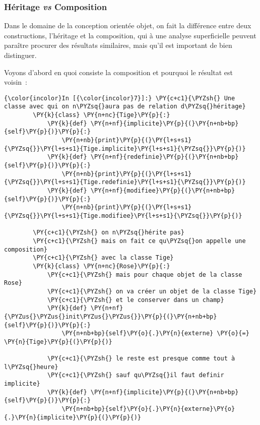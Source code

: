     \hypertarget{huxe9ritage-vs-composition}{%
\subsubsection{\texorpdfstring{Héritage \emph{vs}
Composition}{Héritage vs Composition}}\label{huxe9ritage-vs-composition}}

    Dans le domaine de la conception orientée objet, on fait la différence
entre deux constructions, l'héritage et la composition, qui à une
analyse superficielle peuvent paraître procurer des résultats
similaires, mais qu'il est important de bien distinguer.

Voyons d'abord en quoi consiste la composition et pourquoi le résultat
est voisin~:

    \begin{Verbatim}[commandchars=\\\{\}]
{\color{incolor}In [{\color{incolor}7}]:} \PY{c+c1}{\PYZsh{} Une classe avec qui on n\PYZsq{}aura pas de relation d\PYZsq{}héritage}
        \PY{k}{class} \PY{n+nc}{Tige}\PY{p}{:}
            \PY{k}{def} \PY{n+nf}{implicite}\PY{p}{(}\PY{n+nb+bp}{self}\PY{p}{)}\PY{p}{:}
                \PY{n+nb}{print}\PY{p}{(}\PY{l+s+s1}{\PYZsq{}}\PY{l+s+s1}{Tige.implicite}\PY{l+s+s1}{\PYZsq{}}\PY{p}{)}
            \PY{k}{def} \PY{n+nf}{redefinie}\PY{p}{(}\PY{n+nb+bp}{self}\PY{p}{)}\PY{p}{:}
                \PY{n+nb}{print}\PY{p}{(}\PY{l+s+s1}{\PYZsq{}}\PY{l+s+s1}{Tige.redefinie}\PY{l+s+s1}{\PYZsq{}}\PY{p}{)}
            \PY{k}{def} \PY{n+nf}{modifiee}\PY{p}{(}\PY{n+nb+bp}{self}\PY{p}{)}\PY{p}{:}
                \PY{n+nb}{print}\PY{p}{(}\PY{l+s+s1}{\PYZsq{}}\PY{l+s+s1}{Tige.modifiee}\PY{l+s+s1}{\PYZsq{}}\PY{p}{)}
        
        \PY{c+c1}{\PYZsh{} on n\PYZsq{}hérite pas}
        \PY{c+c1}{\PYZsh{} mais on fait ce qu\PYZsq{}on appelle une composition}
        \PY{c+c1}{\PYZsh{} avec la classe Tige}
        \PY{k}{class} \PY{n+nc}{Rose}\PY{p}{:}
            \PY{c+c1}{\PYZsh{} mais pour chaque objet de la classe Rose}
            \PY{c+c1}{\PYZsh{} on va créer un objet de la classe Tige}
            \PY{c+c1}{\PYZsh{} et le conserver dans un champ}
            \PY{k}{def} \PY{n+nf}{\PYZus{}\PYZus{}init\PYZus{}\PYZus{}}\PY{p}{(}\PY{n+nb+bp}{self}\PY{p}{)}\PY{p}{:}
                \PY{n+nb+bp}{self}\PY{o}{.}\PY{n}{externe} \PY{o}{=} \PY{n}{Tige}\PY{p}{(}\PY{p}{)}
        
            \PY{c+c1}{\PYZsh{} le reste est presque comme tout à l\PYZsq{}heure}
            \PY{c+c1}{\PYZsh{} sauf qu\PYZsq{}il faut definir implicite}
            \PY{k}{def} \PY{n+nf}{implicite}\PY{p}{(}\PY{n+nb+bp}{self}\PY{p}{)}\PY{p}{:}
                \PY{n+nb+bp}{self}\PY{o}{.}\PY{n}{externe}\PY{o}{.}\PY{n}{implicite}\PY{p}{(}\PY{p}{)}
                

\end{Verbatim}
